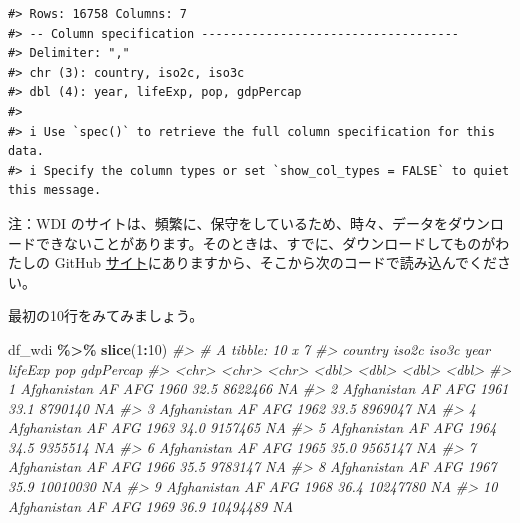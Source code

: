 \documentclass[
  xelatex, ja=standard]{bxjsbook}
\newenvironment{Shaded}{\begin{snugshade}}{\end{snugshade}}
\newcommand{\CommentTok}[1]{\textcolor[rgb]{0.56,0.35,0.01}{\textit{#1}}}
\newcommand{\DecValTok}[1]{\textcolor[rgb]{0.00,0.00,0.81}{#1}}
\newcommand{\FunctionTok}[1]{\textcolor[rgb]{0.13,0.29,0.53}{\textbf{#1}}}
\newcommand{\NormalTok}[1]{#1}
\newcommand{\SpecialCharTok}[1]{\textcolor[rgb]{0.81,0.36,0.00}{\textbf{#1}}}
\theoremstyle{definition}
\theoremstyle{definition}
\theoremstyle{definition}
\theoremstyle{definition}
\theoremstyle{remark}
\begin{document}
\begin{verbatim}
#> Rows: 16758 Columns: 7
#> -- Column specification ------------------------------------
#> Delimiter: ","
#> chr (3): country, iso2c, iso3c
#> dbl (4): year, lifeExp, pop, gdpPercap
#> 
#> i Use `spec()` to retrieve the full column specification for this data.
#> i Specify the column types or set `show_col_types = FALSE` to quiet this message.
\end{verbatim}

注：WDI のサイトは、頻繁に、保守をしているため、時々、データをダウンロードできないことがあります。そのときは、すでに、ダウンロードしてものがわたしの GitHub \href{\%22https://github.com/icu-hsuzuki/ds4aj/blob/main/data/wdi.csv\%22}{サイト}にありますから、そこから次のコードで読み込んでください。

最初の10行をみてみましょう。

\begin{Shaded}
\begin{Highlighting}[]
\NormalTok{df\_wdi }\SpecialCharTok{\%\textgreater{}\%} \FunctionTok{slice}\NormalTok{(}\DecValTok{1}\SpecialCharTok{:}\DecValTok{10}\NormalTok{)}
\CommentTok{\#\textgreater{} \# A tibble: 10 x 7}
\CommentTok{\#\textgreater{}    country     iso2c iso3c  year lifeExp      pop gdpPercap}
\CommentTok{\#\textgreater{}    \textless{}chr\textgreater{}       \textless{}chr\textgreater{} \textless{}chr\textgreater{} \textless{}dbl\textgreater{}   \textless{}dbl\textgreater{}    \textless{}dbl\textgreater{}     \textless{}dbl\textgreater{}}
\CommentTok{\#\textgreater{}  1 Afghanistan AF    AFG    1960    32.5  8622466        NA}
\CommentTok{\#\textgreater{}  2 Afghanistan AF    AFG    1961    33.1  8790140        NA}
\CommentTok{\#\textgreater{}  3 Afghanistan AF    AFG    1962    33.5  8969047        NA}
\CommentTok{\#\textgreater{}  4 Afghanistan AF    AFG    1963    34.0  9157465        NA}
\CommentTok{\#\textgreater{}  5 Afghanistan AF    AFG    1964    34.5  9355514        NA}
\CommentTok{\#\textgreater{}  6 Afghanistan AF    AFG    1965    35.0  9565147        NA}
\CommentTok{\#\textgreater{}  7 Afghanistan AF    AFG    1966    35.5  9783147        NA}
\CommentTok{\#\textgreater{}  8 Afghanistan AF    AFG    1967    35.9 10010030        NA}
\CommentTok{\#\textgreater{}  9 Afghanistan AF    AFG    1968    36.4 10247780        NA}
\CommentTok{\#\textgreater{} 10 Afghanistan AF    AFG    1969    36.9 10494489        NA}
\end{Highlighting}
\end{Shaded}
\end{document}
